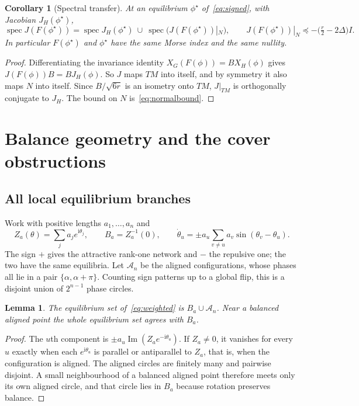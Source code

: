 \documentclass[11pt,a4paper]{article}
\newtheorem{lemma}[theorem]{Lemma}
\newtheorem{corollary}[theorem]{Corollary}
\theoremstyle{definition}\newtheorem{conjecture}{Conjecture}
\theoremstyle{remark}\newtheorem{remark}[theorem]{Remark}
\newcommand{\ii}{\mathrm{i}}
\DeclareMathOperator{\im}{Im}
\begin{document}
\begin{corollary}[Spectral transfer]\label{cor:spectral}
At an equilibrium $\phi^\star$ of~\eqref{eq:signed}, with Jacobian $J_H(\phi^\star)$,
\[
 \operatorname{spec}J(F(\phi^\star))=\operatorname{spec}J_H(\phi^\star)\ \cup\ \operatorname{spec}\bigl(J(F(\phi^\star))|_N\bigr),
 \qquad J(F(\phi^\star))|_N\preceq-\bigl(\tfrac r2-2\Delta\bigr)I .
\]
In particular $F(\phi^\star)$ and $\phi^\star$ have the same Morse index and the same nullity.
\end{corollary}
\begin{proof}
Differentiating the invariance identity $X_G(F(\phi))=BX_H(\phi)$ gives $J(F(\phi))B=BJ_H(\phi)$. So $J$ maps $TM$ into itself, and by symmetry it also maps $N$ into itself. Since $B/\sqrt{6r}$ is an isometry onto $TM$, $J|_{TM}$ is orthogonally conjugate to $J_H$. The bound on $N$ is~\eqref{eq:normalbound}.
\end{proof}

\section{Balance geometry and the cover obstructions}\label{sec:topology}

\subsection{All local equilibrium branches}
Work with positive lengths $a_1,\dots,a_n$ and
\begin{equation}\label{eq:weighted}
 Z_a(\theta)=\sum_ja_je^{\ii\theta_j},\qquad B_a=Z_a^{-1}(0),\qquad
 \dot\theta_u=\pm a_u\sum_{v\neq u}a_v\sin(\theta_v-\theta_u).
\end{equation}
The sign $+$ gives the attractive rank-one network and $-$ the repulsive one; the two have the same equilibria. Let $\mathcal A_n$ be the aligned configurations, whose phases all lie in a pair $\{\alpha,\alpha+\pi\}$. Counting sign patterns up to a global flip, this is a disjoint union of $2^{n-1}$ phase circles.

\begin{lemma}\label{lem:branches}
The equilibrium set of~\eqref{eq:weighted} is $B_a\cup\mathcal A_n$. Near a balanced aligned point the whole equilibrium set agrees with $B_a$.
\end{lemma}
\begin{proof}
The $u$th component is $\pm a_u\im(Z_ae^{-\ii\theta_u})$. If $Z_a\neq0$, it vanishes for every $u$ exactly when each $e^{\ii\theta_u}$ is parallel or antiparallel to $Z_a$, that is, when the configuration is aligned. The aligned circles are finitely many and pairwise disjoint. A small neighbourhood of a balanced aligned point therefore meets only its own aligned circle, and that circle lies in $B_a$ because rotation preserves balance.
\end{proof}
\end{document}
